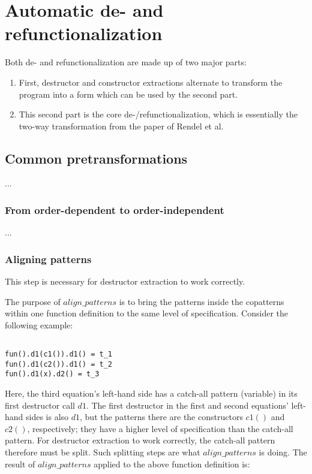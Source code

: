 \chapter{Automatic de- and refunctionalization}

Both de- and refunctionalization are made up of two major parts:
\begin{enumerate}
\item First, destructor and constructor extractions alternate to transform the program into a form which can be used by the second part.

\item This second part is the core de-/refunctionalization, which is essentially the two-way transformation from the paper of Rendel et al.
\end{enumerate}

\section{Common pretransformations}

...

\subsection{From order-dependent to order-independent}

...

\subsection{Aligning patterns}

This step is necessary for destructor extraction to work correctly.

The purpose of $align\_patterns$ is to bring the patterns inside the copatterns within one function definition to the same level of specification. Consider the following example:

\begin{lstlisting}

fun().d1(c1()).d1() = t_1
fun().d1(c2()).d1() = t_2
fun().d1(x).d2() = t_3

\end{lstlisting}

Here, the third equation's left-hand side has a catch-all pattern (variable) in its first destructor call $d1$. The first destructor in the first and second equations' left-hand sides is also $d1$, but the patterns there are the constructors $c1()$ and $c2()$, respectively; they have a higher level of specification than the catch-all pattern. For destructor extraction to work correctly, the catch-all pattern therefore must be split. Such splitting steps are what $align\_patterns$ is doing. The result of $align\_patterns$ applied to the above function definition is:

